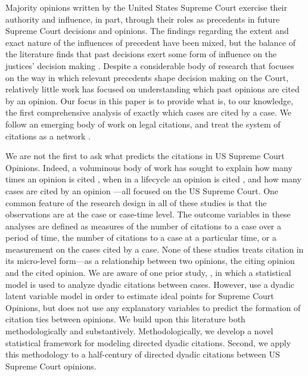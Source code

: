 \documentclass[headsepline=true, abstracton]{scrartcl}
\begin{document}
 
Majority opinions written by the United States Supreme Court exercise their authority and influence, in part, through their roles as precedents in future Supreme Court decisions and opinions. The findings regarding the extent and exact nature of the influences of precedent have been mixed, but the balance of the literature finds that past decisions exert some form of influence on the justices' decision making \citep{knight1996norm,gillman2001s,richards2002jurisprudential,hansford2006politics,bailey2008does,bailey2011constrained}. Despite a considerable body of research that focuses on the way in which relevant precedents shape decision making on the Court, relatively little work has focused on understanding which past opinions are cited by an opinion. Our focus in this paper is to provide what is, to our knowledge, the first comprehensive analysis of exactly which cases are cited by a case. We follow an emerging body of work on legal citations, and treat the system of citations as a network \citep[e.g., ][]{harris1982structural,caldeira1988legal,fowler2007network, fowler2008authority,bommarito2009law,lupu2012precedent,pelc2014politics}. 

We are not the first to ask what predicts the citations in US Supreme Court Opinions. Indeed, a voluminous body of work has sought to explain how many times an opinion is cited \citep[e.g.,][]{cross2010determinants,benjamin2012standing}, when in a lifecycle an opinion is cited \citep[e.g.,][]{black2013citation,spriggs2001explaining}, and how many cases are cited by an opinion \citep[e.g.,][]{lupu2013strategic}---all focused on the US Supreme Court. One common feature of the research design in all of these studies is that the observations are at the case or case-time level. The outcome variables in these analyses are defined as measures of the number of citations to a case over a period of time, the number of citations to a case at a particular time, or a measurement on the cases cited by a case. None of these studies treats citation in its micro-level form---as a relationship between two opinions, the citing opinion and the cited opinion. We are aware of one prior study, \citet{clark2010locating}, in which a statistical model is used to analyze dyadic citations between cases. However, \citet{clark2010locating} use a dyadic latent variable model in order to estimate ideal points for Supreme Court Opinions, but does not use any explanatory variables to predict the formation of citation ties between opinions. We build upon this literature both methodologically and substantively. Methodologically, we develop a novel statistical framework for modeling directed dyadic citations. Second, we apply this methodology to a half-century of directed dyadic citations between US Supreme Court opinions.
\end{document}
